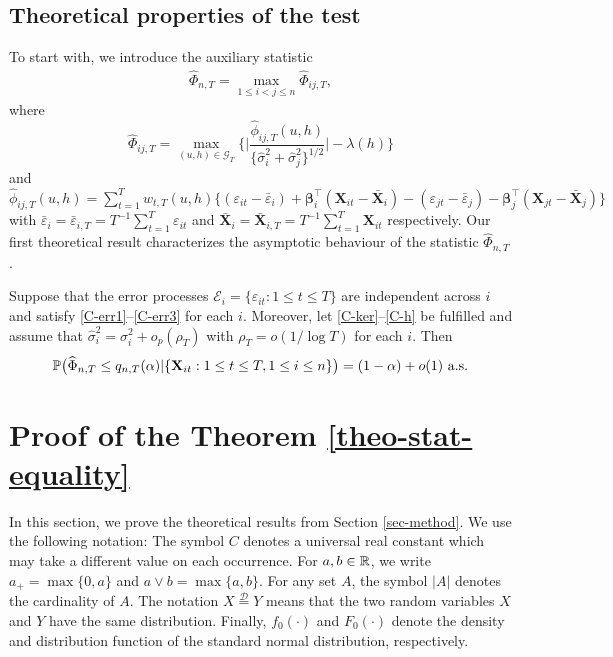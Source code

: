 \documentclass[a4paper,12pt]{article}
\begin{document}
\allowdisplaybreaks[1]

\subsection{Theoretical properties of the test}\label{subsec-test-theo}


To start with, we introduce the auxiliary statistic 
\begin{align}\label{Phi-hat-statistic}
\widehat{\Phi}_{n,T} = \max_{1 \le i < j \le n} \widehat{\Phi}_{ij,T},
\end{align}
where
\[ \widehat{\Phi}_{ij,T} = \max_{(u,h) \in \mathcal{G}_T} \Big\{ \Big| \frac{\widehat{\phi}_{ij,T}(u,h)} {\{ \widehat{\sigma}_i^2 + \widehat{\sigma}_j^2 \}^{1/2}} \Big| - \lambda(h) \Big \} \]
and $\widehat{\phi}_{ij,T}(u,h) = \sum_{t=1}^T w_{t,T}(u,h) \big\{ (\varepsilon_{it} - \bar{\varepsilon}_i) + \bm{\beta}_i^\top (\mathbf{X}_{it} - \bar{\mathbf{X}}_{i}) - (\varepsilon_{jt} - \bar{\varepsilon}_j) -\bm{\beta}_j^\top (\mathbf{X}_{jt} - \bar{\mathbf{X}}_{j}) \big\}$ with $\bar{\varepsilon}_i = \bar{\varepsilon}_{i,T} = T^{-1} \sum_{t=1}^T \varepsilon_{it}$ and $ \bar{\mathbf{X}}_{i} =  \bar{\mathbf{X}}_{i, T} = T^{-1}\sum_{t=1}^T  \mathbf{X}_{it}$ respectively. Our first theoretical result characterizes the asymptotic behaviour of the statistic $\widehat{\Phi}_{n,T}$. 
\begin{theorem}\label{theo-stat-equality}
Suppose that the error processes $\mathcal{E}_i = \{ \varepsilon_{it}: 1 \le t \le T \}$ are independent across $i$ and satisfy \ref{C-err1}--\ref{C-err3} for each $i$. Moreover, let \ref{C-ker}--\ref{C-h} be fulfilled and assume that $\widehat{\sigma}_i^2 = \sigma_i^2 + o_p(\rho_T)$ with $\rho_T = o(1/\log T)$ for each $i$. Then 
\[ \mathbb{P} \big( \widehat{\Phi}_{n,T} \le q_{n,T}(\alpha)| \{ \mathbf{X}_{it}: 1 \le t \le T, 1 \leq i \leq n \} \big) = (1 - \alpha) + o(1) \text{ a.s.} \]
\end{theorem}


\section{Proof of the Theorem \ref{theo-stat-equality}}\label{sec-proof-1}


In this section, we prove the theoretical results from Section \ref{sec-method}. We use the following notation: The symbol $C$ denotes a universal real constant which may take a different value on each occurrence. For $a,b \in \mathbb{R}$, we write $a_+ = \max \{0,a\}$ and $a \vee b = \max\{a,b\}$. For any set $A$, the symbol $|A|$ denotes the cardinality of $A$. The notation $X \stackrel{\mathcal{D}}{=} Y$ means that the two random variables $X$ and $Y$ have the same distribution. Finally, $f_0(\cdot)$ and $F_0(\cdot)$ denote the density and distribution function of the standard normal distribution, respectively.
\end{document}
